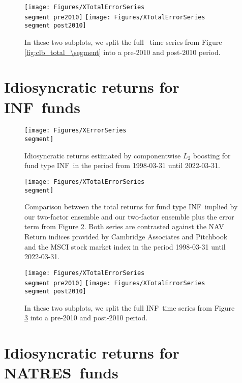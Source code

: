 \begin{figure}[H]
	\centering
	\texttt{[image: Figures/XTotalErrorSeries\\segment pre2010]}
	\texttt{[image: Figures/XTotalErrorSeries\\segment post2010]}
	\caption{
		In these two subplots, we split the full \segment \ time series from Figure \ref{fig:clb_total_\segment} into a pre-2010 and post-2010 period.
	}
	\label{fig:clb_pre_post_2010_\segment}
\end{figure}


\renewcommand{\segment}{INF}

\section{Idiosyncratic returns for \segment \ funds}
\label{sec:errors_\segment}

\begin{figure}[H]
	\centering
	\texttt{[image: Figures/XErrorSeries\\segment]}
	\caption{Idiosyncratic returns estimated by componentwise $L_2$ boosting for fund type \segment \ in the period from 1998-03-31 until 2022-03-31.}
	\label{fig:clb_idio_\segment}
\end{figure}

\begin{figure}[H]
	\centering
	\texttt{[image: Figures/XTotalErrorSeries\\segment]}
	\caption{
		Comparison between the total returns for fund type \segment \ implied by our two-factor ensemble and our two-factor ensemble plus the error term from Figure \ref{fig:clb_idio_\segment}.
		Both series are contrasted against the NAV Return indices provided by Cambridge Associates and Pitchbook and the MSCI stock market index in the period 1998-03-31 until 2022-03-31.
	}
	\label{fig:clb_total_\segment}
\end{figure}

\begin{figure}[H]
	\centering
	\texttt{[image: Figures/XTotalErrorSeries\\segment pre2010]}
	\texttt{[image: Figures/XTotalErrorSeries\\segment post2010]}
	\caption{
		In these two subplots, we split the full \segment \ time series from Figure \ref{fig:clb_total_\segment} into a pre-2010 and post-2010 period.
	}
	\label{fig:clb_pre_post_2010_\segment}
\end{figure}


\renewcommand{\segment}{NATRES}

\section{Idiosyncratic returns for \segment \ funds}
\label{sec:errors_\segment}

